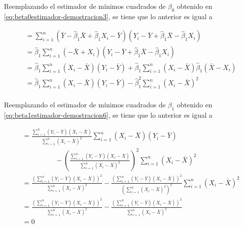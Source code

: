 \documentclass[
  11pt,
]{book}
\theoremstyle{definition}
\theoremstyle{definition}
\theoremstyle{definition}
\theoremstyle{definition}
\theoremstyle{remark}
\begin{document}
Reemplazando el estimador de mínimos cuadrados de \(\beta_0\) obtenido en \eqref{eq:beta0estimador-demostracion3}, se tiene que lo anterior es igual a

\begin{equation}
\begin{split}
&= \sum_{i=1}^n\left( \bar{Y} - \widehat{\beta}_1\bar{X} + \widehat{\beta}_1X_i - \bar{Y} \right)\left( Y_i - \bar{Y} + \widehat{\beta}_1\bar{X} - \widehat{\beta}_1X_i \right)\\
&= \widehat{\beta}_1\sum_{i=1}^n\left(-\bar{X}  + X_i \right) \left( Y_i - \bar{Y} + \widehat{\beta}_1\bar{X} - \widehat{\beta}_1X_i \right) \\
&= \widehat{\beta}_1\sum_{i=1}^n\left(X_i -\bar{X} \right) \left( Y_i - \bar{Y}\right) + \widehat{\beta}_1\sum_{i=1}^n\left(X_i -\bar{X} \right)\widehat{\beta}_1 \left( \bar{X} - X_i \right) \\
&= \widehat{\beta}_1\sum_{i=1}^n\left(X_i -\bar{X} \right) \left( Y_i - \bar{Y}\right) - \widehat{\beta}_1^2\sum_{i=1}^n\left(X_i -\bar{X} \right)^2 \\
\end{split}
\label{eq:demostracionSCT4}
\end{equation}

Reemplazando el estimador de mínimos cuadrados de \(\beta_1\) obtenido en \eqref{eq:beta1estimador-demostracion6}, se tiene que lo anterior es igual a

\begin{equation}
\begin{split}
&= \frac{\displaystyle\sum_{i=1}^n (Y_i - \bar{Y})(X_i - \bar{X})}{\displaystyle\sum_{i=1}^n(X_i -\bar{X})^2}\sum_{i=1}^n\left(X_i -\bar{X} \right) \left( Y_i - \bar{Y}\right)\\
& \hspace{2cm} - \left( \frac{\displaystyle\sum_{i=1}^n (Y_i - \bar{Y})(X_i - \bar{X})}{\displaystyle\sum_{i=1}^n(X_i -\bar{X})^2} \right)^2\sum_{i=1}^n\left(X_i -\bar{X} \right)^2 \\
&= \frac{\left(\displaystyle\sum_{i=1}^n (Y_i - \bar{Y})(X_i - \bar{X})\right)^2}{\displaystyle\sum_{i=1}^n(X_i -\bar{X})^2} - \frac{\left( \displaystyle\sum_{i=1}^n (Y_i - \bar{Y})(X_i - \bar{X})\right)^2}{\left(\displaystyle\sum_{i=1}^n(X_i -\bar{X})^2\right)^2} \sum_{i=1}^n\left(X_i -\bar{X} \right)^2 \\
&= \frac{\left(\displaystyle\sum_{i=1}^n (Y_i - \bar{Y})(X_i - \bar{X})\right)^2}{\displaystyle\sum_{i=1}^n(X_i -\bar{X})^2} - \frac{\left( \displaystyle\sum_{i=1}^n (Y_i - \bar{Y})(X_i - \bar{X})\right)^2}{\displaystyle\sum_{i=1}^n(X_i -\bar{X})^2}\\
& = 0
\end{split}
\label{eq:demostracionSCT5}
\end{equation}
\end{document}
